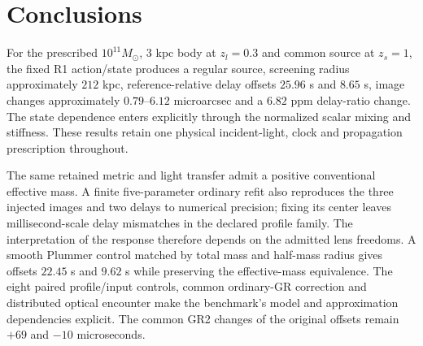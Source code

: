 \section{Conclusions}
For the prescribed $10^{11}M_\odot$, $3$ kpc body at $z_l=0.3$ and
common source at $z_s=1$, the fixed R1 action/state produces a regular
source, screening radius approximately $212$ kpc, reference-relative
delay offsets $25.96$ s and $8.65$ s, image changes approximately
$0.79$--$6.12$ microarcsec and a $6.82$ ppm delay-ratio change.
The state dependence enters explicitly through the normalized scalar
mixing and stiffness. These results retain one physical incident-light,
clock and propagation prescription throughout.

The same retained metric and light transfer admit a positive
conventional effective mass. A finite five-parameter ordinary refit
also reproduces the three injected images and two delays to numerical
precision; fixing its center leaves millisecond-scale delay mismatches
in the declared profile family. The interpretation of the response
therefore depends on the admitted lens freedoms. A smooth Plummer
control matched by total mass and half-mass radius gives offsets
$22.45$ s and $9.62$ s while preserving the effective-mass equivalence.
The eight paired profile/input controls, common ordinary-GR correction
and distributed optical encounter make the benchmark's model and
approximation dependencies explicit. The common GR2 changes of the
original offsets remain $+69$ and $-10$ microseconds.

